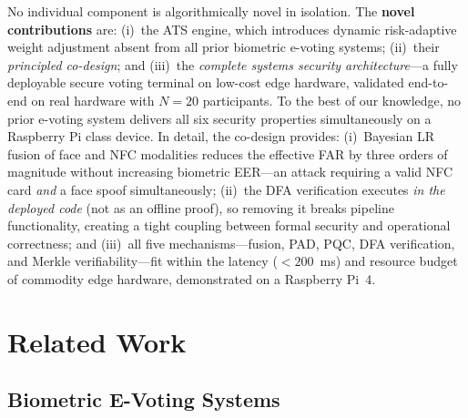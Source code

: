 \documentclass[pdflatex,sn-mathphys-num]{sn-jnl}%
\theoremstyle{thmstyleone}%
\theoremstyle{thmstyletwo}%
\theoremstyle{thmstylethree}%
\begin{document}
No individual component is algorithmically novel in isolation. The
\textbf{novel contributions} are: (i)~the ATS engine, which introduces
dynamic risk-adaptive weight adjustment absent from all prior biometric
e-voting systems; (ii)~their \emph{principled co-design}; and (iii)~the
\emph{complete systems security architecture}---a fully deployable secure
voting terminal on low-cost edge hardware, validated end-to-end on real
hardware with \(N{=}20\) participants. To the best of our knowledge, no
prior e-voting system delivers all six security properties simultaneously on
a Raspberry Pi class device. In detail, the co-design provides: (i)~Bayesian
LR fusion of face and NFC modalities reduces the effective FAR by three
orders of magnitude without increasing biometric EER---an attack requiring a
valid NFC card \emph{and} a face spoof simultaneously; (ii)~the DFA
verification executes \emph{in the deployed code} (not as an offline proof),
so removing it breaks pipeline functionality, creating a tight coupling
between formal security and operational correctness; and (iii)~all five
mechanisms---fusion, PAD, PQC, DFA verification, and Merkle
verifiability---fit within the latency (\(<200\)~ms) and resource budget of
commodity edge hardware, demonstrated on a Raspberry Pi~4.

\section{Related Work}\label{sec:related}

\subsection{Biometric E-Voting Systems}
\end{document}
